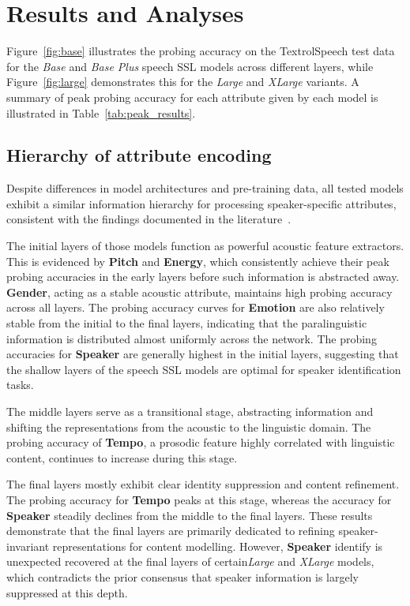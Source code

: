 \documentclass[cameraready]{Interspeech}
\begin{document}
\section{Results and Analyses}


Figure~\ref{fig:base} illustrates the probing accuracy on the TextrolSpeech test data for the \textit{Base} and \textit{Base Plus} speech SSL models \cite{wav2vec2, hubert, unispeech-sat, wavlm} across different layers, while Figure~\ref{fig:large} demonstrates this for the \textit{Large} and \textit{XLarge} variants. A summary of peak probing accuracy for each attribute given by each model is illustrated in Table~\ref{tab:peak_results}.


\subsection{Hierarchy of attribute encoding}
\label{sec:hierarchical}

Despite differences in model architectures and pre-training data, all tested models exhibit a similar information hierarchy for processing speaker-specific attributes, consistent with the findings documented in the literature~\cite{ssl, yang2024taslp}.

The initial layers of those models function as powerful acoustic feature extractors. This is evidenced by \textbf{Pitch} and \textbf{Energy}, which consistently achieve their peak probing accuracies in the early layers before such information is abstracted away. \textbf{Gender}, acting as a stable acoustic attribute, maintains high probing accuracy across all layers. The probing accuracy curves for \textbf{Emotion} are also relatively stable from the initial to the final layers, indicating that the paralinguistic information is distributed almost uniformly across the network. The probing accuracies for \textbf{Speaker} are generally highest in the initial layers, suggesting that the shallow layers of the speech SSL models are optimal for speaker identification tasks.

The middle layers serve as a transitional stage, abstracting information and shifting the representations from the acoustic to the linguistic domain. The probing accuracy of \textbf{Tempo}, a prosodic feature highly correlated with linguistic content, continues to increase during this stage.

The final layers mostly exhibit clear identity suppression and content refinement. The probing accuracy for \textbf{Tempo} peaks at this stage, whereas the accuracy for \textbf{Speaker} steadily declines from the middle to the final layers. These results demonstrate that the final layers are primarily dedicated to refining speaker-invariant representations for content modelling. However, \textbf{Speaker} identify is unexpected recovered at the final layers of certain\textit{Large} and \textit{XLarge} models, which contradicts the prior consensus that speaker information is largely suppressed at this depth.
\end{document}
